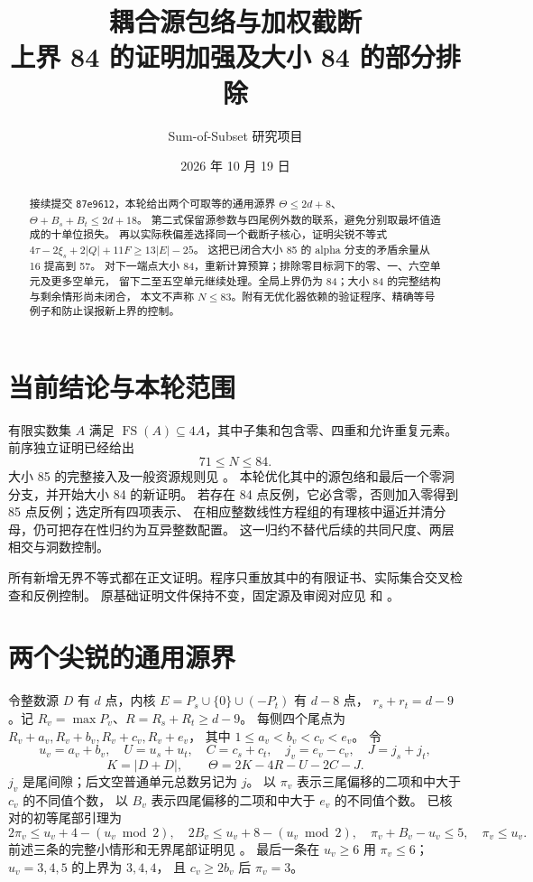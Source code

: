 \documentclass[11pt,a4paper]{article}
\title{耦合源包络与加权截断\\\large 上界 84 的证明加强及大小 84 的部分排除}
\author{Sum-of-Subset 研究项目}
\date{2026 年 10 月 19 日}
\newcommand{\FS}{\operatorname{FS}}
\begin{document}
\maketitle
\begin{abstract}
接续提交 \texttt{87e9612}，本轮给出两个可取等的通用源界
$\Theta\le2d+8$、$\Theta+B_s+B_t\le2d+18$。
第二式保留源参数与四尾例外数的联系，避免分别取最坏值造成的十单位损失。
再以实际秩偏差选择同一个截断子核心，证明尖锐不等式
$4\tau-2\xi_s+2|Q|+11F\ge13|E|-25$。
这把已闭合大小 85 的 alpha 分支的矛盾余量从 16 提高到 57。
对下一端点大小 84，重新计算预算；排除零目标洞下的零、一、六空单元及更多空单元，
留下二至五空单元继续处理。全局上界仍为 84；大小 84 的完整结构与剩余情形尚未闭合，
本文不声称 $N\le83$。附有无优化器依赖的验证程序、精确等号例子和防止误报新上界的控制。
\end{abstract}

\section{当前结论与本轮范围}
有限实数集 $A$ 满足 $\FS(A)\subseteq4A$，其中子集和包含零、四重和允许重复元素。
前序独立证明已经给出
\[\boxed{71\le N\le84.}\]
大小 85 的完整接入及一般资源规则见
。
本轮优化其中的源包络和最后一个零洞分支，并开始大小 84 的新证明。
若存在 84 点反例，它必含零，否则加入零得到 85 点反例；选定所有四项表示、
在相应整数线性方程组的有理核中逼近并清分母，仍可把存在性归约为互异整数配置。
这一归约不替代后续的共同尺度、两层相交与洞数控制。

所有新增无界不等式都在正文证明。程序只重放其中的有限证书、实际集合交叉检查和反例控制。
原基础证明文件保持不变，固定源及审阅对应见
 和
。

\section{两个尖锐的通用源界}\label{sec:source}
令整数源 $D$ 有 $d$ 点，内核
$E=P_s\cup\{0\}\cup(-P_t)$ 有 $d-8$ 点，
$r_s+r_t=d-9$。记 $R_v=\max P_v$、$R=R_s+R_t\ge d-9$。
每侧四个尾点为 $R_v+a_v,R_v+b_v,R_v+c_v,R_v+e_v$，
其中 $1\le a_v<b_v<c_v<e_v$。
令
\[
u_v=a_v+b_v,\quad U=u_s+u_t,\quad C=c_s+c_t,\quad
j_v=e_v-c_v,\quad J=j_s+j_t,
\]
\[
K=|D+D|,\qquad \Theta=2K-4R-U-2C-J.
\]
$j_v$ 是尾间隙；后文空普通单元总数另记为 $j$。
以 $\pi_v$ 表示三尾偏移的二项和中大于 $c_v$ 的不同值个数，
以 $B_v$ 表示四尾偏移的二项和中大于 $e_v$ 的不同值个数。
已核对的初等尾部引理为
\begin{equation}\label{eq:fringe}
2\pi_v\le u_v+4-(u_v\bmod2),\quad
2B_v\le u_v+8-(u_v\bmod2),\quad
\pi_v+B_v-u_v\le5,\quad\pi_v\le u_v.
\end{equation}
前述三条的完整小情形和无界尾部证明见
。
最后一条在 $u_v\ge6$ 用 $\pi_v\le6$；$u_v=3,4,5$ 的上界为 $3,4,4$，
且 $c_v\ge2b_v$ 后 $\pi_v=3$。
\end{document}
